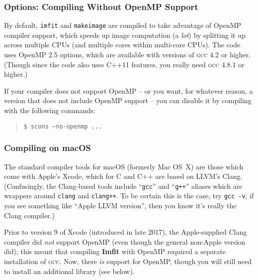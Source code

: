 \documentclass[10pt,a4paper,article]{memoir}
\newcommand{\imfit}{\textbf{Imfit}}
\newcommand{\imfitprog}{\texttt{imfit}}
\newcommand{\makeimage}{\texttt{makeimage}}
\begin{document}


\subsubsection{Options: Compiling Without OpenMP Support}

By default, \imfitprog{} and \makeimage{} are compiled to take advantage
of OpenMP compiler support, which speeds up image computation (a
\textit{lot}) by splitting it up across multiple CPUs (and multiple
cores within multi-core CPUs). The code uses OpenMP 2.5 options, which
are available with versions of \textsc{gcc} 4.2 or higher. (Though since
the code also uses C++11 features, you really need \textsc{gcc} 4.8.1 or
higher.)

If your compiler
does not support OpenMP -- or you want, for whatever reason, a version
that does not include OpenMP support -- you can disable it by compiling
with the following commands:
\begin{quote}
\texttt{\$ scons --no-openmp ...}
\end{quote}


\subsubsection{Compiling on macOS}

The standard compiler tools for macOS (formerly Mac OS~X) are those
which come with Apple's Xcode, which for C and C++ are based on LLVM's
Clang. (Confusingly, the Clang-based tools include ``\texttt{gcc}'' and
``\texttt{g++}'' aliases which are wrappers around \texttt{clang} and
\texttt{clang++}. To be certain this is the case, try \texttt{gcc -v};
if you see something like ``Apple LLVM version'', then you know it's
really the Clang compiler.)

Prior to version 9 of Xcode (introduced in late 2017), the
Apple-supplied Clang compiler did \textit{not} support OpenMP (even though
the general non-Apple version did); this meant
that compiling \imfit{} with OpenMP required a separate installation
of \textsc{gcc}. Now, there \textit{is} support for OpenMP, though
you will still need to install an additional library (see below).
\end{document}
